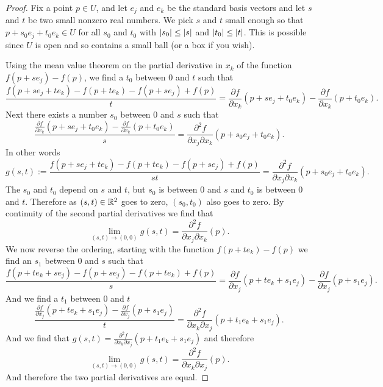 \begin{proof}
Fix a point $p \in U$, and let $e_j$ and $e_k$ be the standard basis
vectors and let $s$ and $t$ be two small nonzero real numbers.  We pick $s$
and $t$ small enough so that
$p+s_0e_j +t_0e_k \in U$ for all $s_0$ and $t_0$ with
$\lvert {s_0} \rvert \leq \lvert {s} \rvert$ and
$\lvert {t_0} \rvert \leq \lvert {t} \rvert$.  This is possible since $U$ is open and so
contains a small ball (or a box if you wish).

Using the mean value theorem on the partial derivative in $x_k$ of the
function $f(p+se_j)-f(p)$,
we find a $t_0$ between $0$ and $t$
such that
\begin{equation*}
\frac{f(p+se_j + te_k)- f(p+t e_k) - f(p+s e_j)+f(p)}{t}
=
\frac{\partial f}{\partial x_k}(p + s e_j + t_0 e_k)
-
\frac{\partial f}{\partial x_k}(p + t_0 e_k) .
\end{equation*}
Next there exists a number $s_0$ between $0$ and $s$ such that
\begin{equation*}
\frac{\frac{\partial f}{\partial x_k}(p + s e_j + t_0 e_k)
-
\frac{\partial f}{\partial x_k}(p + t_0 e_k)}{s}
=
\frac{\partial^2 f}{\partial x_j \partial x_k}(p + s_0 e_j + t_0 e_k) .
\end{equation*}
In other words
\begin{equation*}
g(s,t) :=
\frac{f(p+se_j + te_k)- f(p+t e_k) - f(p+s e_j)+f(p)}{st}
=
\frac{\partial^2 f}{\partial x_j \partial x_k}(p + s_0 e_j + t_0 e_k) .
\end{equation*}
The $s_0$ and $t_0$ depend on $s$ and $t$,
but $s_0$ is 
between $0$ and $s$ and
$t_0$ is 
between $0$ and $t$.
Therefore
as $(s,t) \in {\mathbb{R}}^2$ goes to zero, $(s_0,t_0)$ also goes to zero.
By continuity of the second partial derivatives we
find that
\begin{equation*}
\lim_{(s,t) \to (0,0)} g(s,t) = 
\frac{\partial^2 f}{\partial x_j \partial x_k}(p) .
\end{equation*}
We now reverse the ordering, starting with
the function $f(p+te_k)-f(p)$ we find an $s_1$ between $0$ and $s$ such that
\begin{equation*}
\frac{f(p+te_k + se_j)- f(p+s e_j) - f(p+t e_k)+f(p)}{s}
=
\frac{\partial f}{\partial x_j}(p + t e_k + s_1 e_j)
-
\frac{\partial f}{\partial x_j}(p + s_1 e_j) .
\end{equation*}
And we find a $t_1$ between $0$ and $t$
\begin{equation*}
\frac{\frac{\partial f}{\partial x_j}(p + t e_k + s_1 e_j)
-
\frac{\partial f}{\partial x_j}(p + s_1 e_j)}{t}
=
\frac{\partial^2 f}{\partial x_k \partial x_j}(p + t_1 e_k + s_1 e_j) .
\end{equation*}
And we find that $g(s,t) = \frac{\partial^2 f}{\partial x_k \partial
x_j}(p + t_1 e_k + s_1 e_j)$ and therefore
\begin{equation*}
\lim_{(s,t) \to (0,0)} g(s,t) = 
\frac{\partial^2 f}{\partial x_k \partial x_j}(p) .
\end{equation*}
And therefore the two partial derivatives are equal.
\end{proof}

